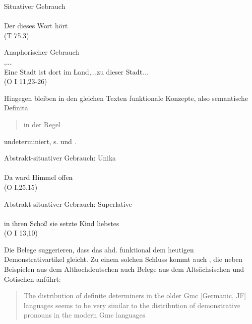 \begin{exe} 
\ex \label{ex:demske-prag1}
	Situativer Gebrauch \\
	\gll {}    \\
		Der dieses Wort hört\\
	\trans {} (T 75.3)
\end{exe}

\begin{exe} 
\ex \label{ex:demske-prag2} 
	Anaphorischer Gebrauch \\
	\gll {}     ,...   \\
		Eine Stadt ist dort im Land,...zu dieser Stadt...\\
	\trans  {} (O I 11,23-26)
\end{exe}

\noindent 
Hingegen bleiben in den gleichen Texten funktionale Konzepte, also semantische Definita \blockcquote[114]{Demske2001}{in der Regel} undeterminiert, s.  und . 

\begin{exe} 
\ex \label{ex:demske-sem1} 
	Abstrakt-situativer Gebrauch: Unika \\
	\gll {}    \\
		Da ward Himmel offen \\
	\trans {} (O I,25,15) 
\end{exe}

\begin{exe} 
\ex \label{ex:demske-sem2} 
	Abstrakt-situativer Gebrauch: Superlative \\
	\gll {}      \\
		 in ihren Schoß sie setzte Kind liebstes\\
	\trans  {} (O I 13,10)
\end{exe}

\noindent 
Die Belege suggerieren, dass das ahd.  funktional dem heutigen Demonstrativartikel gleicht. Zu einem solchen Schluss kommt auch \textcite{Philippi1997}, die neben Beispielen aus dem Althochdeutschen auch Belege aus dem  Altsächsischen und Gotischen anführt: \blockcquote[86]{Philippi1997}{The distribution of definite determiners in the older Gmc [Germanic, JF] languages seems to be very similar to the distribution of demonstrative pronouns in the
modern Gmc languages}. 

